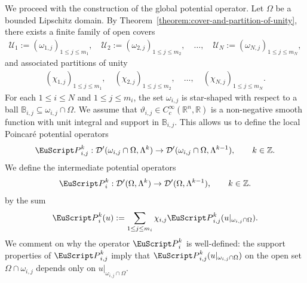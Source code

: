 \documentclass[10pt,a4paper]{amsart}
\theoremstyle{definition}
\theoremstyle{remark}
\numberwithin{equation}{section}
\newcommand{\bbB}{{\mathbb B}}
\newcommand{\bbR}{{\mathbb R}}
\newcommand{\bbZ}{{\mathbb Z}}
\newcommand{\calD}{{\mathcal D}}
\newcommand{\calU}{{\mathcal U}}
\newcommand{\euP}{{\EuScript P}}
\renewcommand{\restriction}{|}
\newcommand{\smallball}{\bbB}
\newcommand{\Domain}{{\Omega}}
\newcommand{\subdomain}{{\omega}}
\newcommand{\Cover}{\calU}
\newcommand{\Alt}[1]{\Lambda^{#1}}
\newcommand{\Poincare}{\euP}
\newcommand{\weight}{\vartheta}
\begin{document}
We proceed with the construction of the global potential operator.
Let $\Domain$ be a bounded Lipschitz domain. 
By Theorem~\ref{theorem:cover-and-partition-of-unity}, there exists a finite family of open covers 
\begin{align*}
    \Cover_{1} := (\subdomain_{1,j})_{1 \leq j \leq m_{1}}, 
    \quad
    \Cover_{2} := (\subdomain_{2,j})_{1 \leq j \leq m_{2}}, 
    \quad
    \dots,
    \quad
    \Cover_{N} := (\subdomain_{N,j})_{1 \leq j \leq m_{N}},
\end{align*}
and associated partitions of unity 
\begin{align*}
    ( \chi_{1,j})_{1 \leq j \leq m_{1}}, 
    \quad
    ( \chi_{2,j})_{1 \leq j \leq m_{2}}, 
    \quad
    \dots, 
    \quad
    ( \chi_{N,j})_{1 \leq j \leq m_{N}}.
\end{align*}
For each $1 \leq i \leq N$ and $1 \leq j \leq m_{i}$, the set $\subdomain_{i,j}$ is star-shaped with respect to a ball $\smallball_{i,j} \subseteq \subdomain_{i,j} \cap \Domain$. 
We assume that $\weight_{i,j} \in C^{\infty}_{c}(\bbR^{n},\bbR)$ is a non-negative smooth function with unit integral and support in $\smallball_{i,j}$.
This allows us to define the local Poincar\'e potential operators 
\begin{align*}
    \Poincare^{k}_{i,j} : \calD'(\subdomain_{i,j} \cap \Domain,\Alt{k}) \to \calD'(\subdomain_{i,j} \cap \Domain,\Alt{k-1})
    ,
    \qquad 
    k \in \bbZ
    .
\end{align*}
We define the intermediate potential operators 
\begin{align*}
    \Poincare^{k}_{i} : \calD'(\Domain,\Alt{k}) \to \calD'(\Domain,\Alt{k-1})
    ,
    \qquad 
    k \in \bbZ
    .
\end{align*}
by the sum 
\begin{align*}
    \Poincare^{k}_{i}(u) := \sum_{1 \leq j \leq m_{i}} \chi_{i,j} \Poincare^{k}_{i,j}( u \restriction_{ \subdomain_{i,j}  \cap \Domain} ).
\end{align*}
We comment on why the operator $\Poincare^{k}_{i}$ is well-defined: 
the support properties of $\Poincare^{k}_{i,j}$ imply that $\Poincare^{k}_{i,j}( u \restriction_{ \subdomain_{i,j} \cap \Domain } )$ on the open set $\Domain \cap \subdomain_{i,j}$ depends only on $u \restriction_{ \subdomain_{i,j} \cap \Domain }$. 
\end{document}

